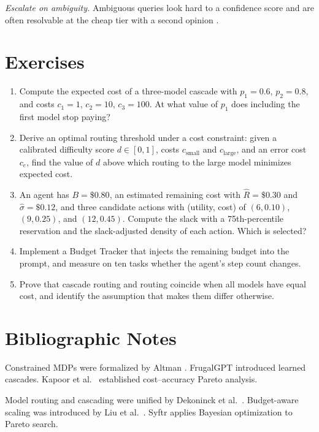 \documentclass[11pt]{book}
\begin{document}
\textit{Escalate on ambiguity.} Ambiguous queries look hard to a confidence score and are often resolvable at the cheap tier with a second opinion \cite{cascadedebate2026}.

\section*{Exercises}

\begin{enumerate}
\item Compute the expected cost of a three-model cascade with $p_1 = 0.6$, $p_2 = 0.8$, and costs $c_1 = 1$, $c_2 = 10$, $c_3 = 100$. At what value of $p_1$ does including the first model stop paying?

\item Derive an optimal routing threshold under a cost constraint: given a calibrated difficulty score $d \in [0,1]$, costs $c_{\text{small}}$ and $c_{\text{large}}$, and an error cost $c_e$, find the value of $d$ above which routing to the large model minimizes expected cost.

\item An agent has $B = \$0.80$, an estimated remaining cost with $\hat{R} = \$0.30$ and $\hat{\sigma} = \$0.12$, and three candidate actions with (utility, cost) of $(6, 0.10)$, $(9, 0.25)$, and $(12, 0.45)$. Compute the slack with a 75th-percentile reservation and the slack-adjusted density of each action. Which is selected?

\item Implement a Budget Tracker that injects the remaining budget into the prompt, and measure on ten tasks whether the agent's step count changes.

\item Prove that cascade routing and routing coincide when all models have equal cost, and identify the assumption that makes them differ otherwise.
\end{enumerate}

\section*{Bibliographic Notes}

Constrained MDPs were formalized by Altman \cite{altman1999constrained}. FrugalGPT \cite{chen2023frugalgpt} introduced learned cascades. Kapoor et al.\ \cite{kapoor2024agents} established cost--accuracy Pareto analysis.

Model routing and cascading were unified by Dekoninck et al.\ \cite{dekoninck2025cascade}. Budget-aware scaling was introduced by Liu et al.\ \cite{liu2025bats}. Syftr \cite{dey2025syftr} applies Bayesian optimization to Pareto search.
\end{document}
